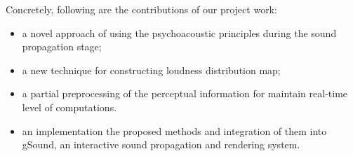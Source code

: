 Concretely, following are the contributions of our project work:
\begin{itemize}
\item a novel approach of using the psychoacoustic principles during the sound propagation stage;
\item a new technique for constructing loudness distribution map;
\item a partial preprocessing of the perceptual information for maintain real-time level of computations. 
\item an implementation the proposed methods and integration of them into gSound, an interactive sound propagation and rendering system.
\end{itemize}




